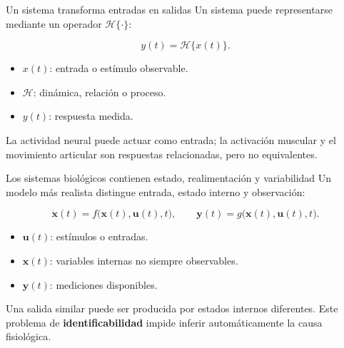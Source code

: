 \documentclass[
  ignorenonframetext,
  aspectratio=169,
  spanish,
  professionalfonts]{beamer}
\providecommand{\tightlist}{%
  \setlength{\itemsep}{0pt}\setlength{\parskip}{0pt}}
\begin{document}
\begin{frame}{Un sistema transforma entradas en salidas}
\protect{}\label{un-sistema-transforma-entradas-en-salidas}
Un sistema puede representarse mediante un operador
\(\mathcal{H}\{\cdot\}\):

\[
y(t)=\mathcal{H}\{x(t)\}.
\]

\begin{itemize}
\tightlist
\item
  \(x(t)\): entrada o estímulo observable.
\item
  \(\mathcal{H}\): dinámica, relación o proceso.
\item
  \(y(t)\): respuesta medida.
\end{itemize}

\begin{tcolorbox}[enhanced jigsaw, arc=.35mm, bottomrule=.15mm, bottomtitle=1mm, breakable, colback=white, colbacktitle=quarto-callout-tip-color!10!white, colframe=quarto-callout-tip-color-frame, coltitle=black, left=2mm, leftrule=.75mm, opacityback=0, opacitybacktitle=0.6, rightrule=.15mm, title={Ejemplo biomédico}, titlerule=0mm, toprule=.15mm, toptitle=1mm]

La actividad neural puede actuar como entrada; la activación muscular y
el movimiento articular son respuestas relacionadas, pero no
equivalentes.

\end{tcolorbox}
\end{frame}

\begin{frame}{Los sistemas biológicos contienen estado, realimentación y
variabilidad}
\protect{}\label{los-sistemas-bioluxf3gicos-contienen-estado-realimentaciuxf3n-y-variabilidad}
Un modelo más realista distingue entrada, estado interno y observación:

\[
\dot{\mathbf{x}}(t)=f\big(\mathbf{x}(t),\mathbf{u}(t),t\big),
\qquad
\mathbf{y}(t)=g\big(\mathbf{x}(t),\mathbf{u}(t),t\big).
\]

\begin{itemize}
\tightlist
\item
  \(\mathbf{u}(t)\): estímulos o entradas.
\item
  \(\mathbf{x}(t)\): variables internas no siempre observables.
\item
  \(\mathbf{y}(t)\): mediciones disponibles.
\end{itemize}

\begin{tcolorbox}[enhanced jigsaw, arc=.35mm, bottomrule=.15mm, bottomtitle=1mm, breakable, colback=white, colbacktitle=quarto-callout-warning-color!10!white, colframe=quarto-callout-warning-color-frame, coltitle=black, left=2mm, leftrule=.75mm, opacityback=0, opacitybacktitle=0.6, rightrule=.15mm, title={Limitación del modelo}, titlerule=0mm, toprule=.15mm, toptitle=1mm]

Una salida similar puede ser producida por estados internos diferentes.
Este problema de \textbf{identificabilidad} impide inferir
automáticamente la causa fisiológica.

\end{tcolorbox}
\end{frame}
\end{document}
